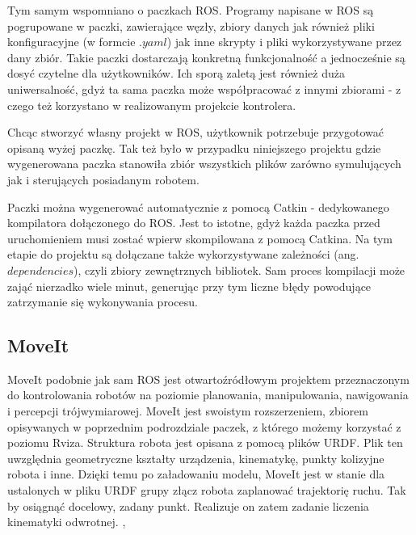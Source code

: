 Tym samym wspomniano o paczkach ROS. Programy napisane w ROS są pogrupowane w paczki, zawierające węzły, zbiory danych jak również pliki konfiguracyjne (w formcie $.yaml$) jak inne skrypty i pliki wykorzystywane przez dany zbiór. Takie paczki dostarczają konkretną funkcjonalność a jednocześnie są dosyć czytelne dla użytkowników. Ich sporą zaletą jest również duża uniwersalność, gdyż ta sama paczka może współpracować z innymi zbiorami - z czego też korzystano w realizowanym projekcie kontrolera. 

Chcąc stworzyć własny projekt w ROS, użytkownik potrzebuje przygotować opisaną wyżej paczkę. Tak też było w przypadku niniejszego projektu gdzie wygenerowana paczka stanowiła zbiór wszystkich plików zarówno symulujących jak i sterujących posiadanym robotem. 

Paczki można wygenerować automatycznie z pomocą Catkin - dedykowanego kompilatora dołączonego do ROS. Jest to istotne, gdyż każda paczka przed uruchomieniem musi zostać wpierw skompilowana z pomocą Catkina. Na tym etapie do projektu są dołączane także wykorzystywane zależności (ang. $dependencies$), czyli zbiory zewnętrznych bibliotek. Sam proces kompilacji może zająć nierzadko wiele minut, generując przy tym liczne błędy powodujące zatrzymanie się wykonywania procesu. 

\subsection{MoveIt}
MoveIt podobnie jak sam ROS jest otwartoźródłowym projektem przeznaczonym do kontrolowania robotów na poziomie planowania, manipulowania, nawigowania i percepcji trójwymiarowej. MoveIt jest swoistym rozszerzeniem, zbiorem opisywanych w poprzednim podrozdziale paczek, z którego możemy korzystać z poziomu Rviza. Struktura robota jest opisana z pomocą plików URDF. Plik ten uwzględnia geometryczne kształty urządzenia, kinematykę, punkty kolizyjne robota i inne. Dzięki temu po załadowaniu modelu, MoveIt jest w stanie dla ustalonych w pliku URDF grupy złącz robota zaplanować trajektorię ruchu. Tak by osiągnąć docelowy, zadany punkt. Realizuje on zatem zadanie liczenia kinematyki odwrotnej.  \cite{MoveitDoc},  \cite{OMPL_Mov}

